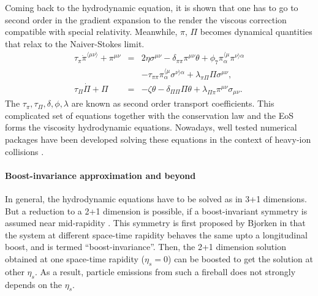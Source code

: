 Coming back to the hydrodynamic equation, it is shown that one has to go to second order in the gradient expansion to the render the viscous correction compatible with special relativity.
Meanwhile, $\pi$, $\Pi$ becomes dynamical quantities that relax to the Naiver-Stokes limit.
\begin{eqnarray}
\tau_\pi \dot{\pi}^{\langle\mu\nu\rangle}+\pi^{\mu\nu} &=& 2\eta\sigma^{\mu\nu}- \delta_{\pi\pi}\pi^{\mu\nu}\theta + \phi_7 \pi_{\alpha}^{\langle\mu}\pi^{\nu\rangle\alpha}\\ 
\nonumber
&& -\tau_{\pi\pi}\pi_{\alpha}^{\langle\mu}\sigma^{\nu\rangle\alpha} + \lambda_{\pi\Pi}\Pi\sigma^{\mu\nu},
\\
\tau_{\Pi}\dot{\Pi} + \Pi &=& -\zeta\theta - \delta_{\Pi\Pi}\Pi\theta + \lambda_{\Pi\pi}\pi^{\mu\nu}\sigma_{\mu\nu}.
\end{eqnarray}
The $\tau_\pi, \tau_\Pi, \delta, \phi, \lambda$ are known as second order transport coefficients.
This complicated set of equations together with the conservation law and the EoS forms the viscosity hydrodynamic equations.
Nowadays, well tested numerical packages have been developed solving these equations in the context of heavy-ion collisions \cite{Song:2007ux,Shen:2014vra,Schenke:2010nt,Karpenko:2013wva}.

\paragraph{Boost-invariance approximation and beyond}
In general, the hydrodynamic equations have to be solved as in 3+1 dimensions.
But a reduction to a 2+1 dimension is possible, if a boost-invariant symmetry is assumed near mid-rapidity \cite{Miller:2007ri, Drescher:2006ca, Schenke:2012wb, Niemi:2015qia, Moreland:2014oya, Chatterjee:2015aja}.
This symmetry is first proposed by Bjorken in \cite{PhysRevD.27.140} that the system at different space-time rapidity behaves the same upto a longitudinal boost, and is termed ``boost-invariance''.
Then, the 2+1 dimension solution obtained at one space-time rapidity ($\eta_s = 0$) can be boosted to get the solution at other $\eta_s$.
As a result, particle emissions from such a fireball does not strongly depends on the $\eta_s$.

